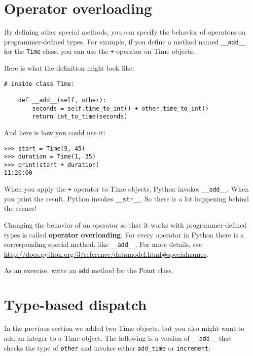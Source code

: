 \section{Operator overloading}
\label{operator.overloading}

By defining other special methods, you can specify the behavior
of operators on programmer-defined types.  For example, if you define
a method named \verb"__add__" for the {\tt Time} class, you can use the
{\tt +} operator on Time objects.

Here is what the definition might look like:

\begin{lstlisting}
# inside class Time:

    def __add__(self, other):
        seconds = self.time_to_int() + other.time_to_int()
        return int_to_time(seconds)
\end{lstlisting}

%
And here is how you could use it:

\begin{lstlisting}
>>> start = Time(9, 45)
>>> duration = Time(1, 35)
>>> print(start + duration)
11:20:00
\end{lstlisting}

%
When you apply the {\tt +} operator to Time objects, Python invokes
\verb"__add__".  When you print the result, Python invokes
\verb"__str__".  So there is a lot happening behind the scenes!

Changing the behavior of an operator so that it works with
programmer-defined types is called {\bf operator overloading}.  For every
operator in Python there is a corresponding special method, like
\verb"__add__".  For more details, see
\url{http://docs.python.org/3/reference/datamodel.html#specialnames}.

As an exercise, write an {\tt add} method for the Point class.


\section{Type-based dispatch}

In the previous section we added two Time objects, but you
also might want to add an integer to a Time object.  The
following is a version of \verb"__add__"
that checks the type of {\tt other} and invokes either
\verb"add_time" or {\tt increment}:

